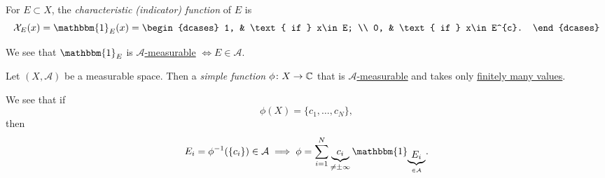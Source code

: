 \begin{definition}\label{def:characteristic-function}
	For \(E\subset X\), the \emph{characteristic (indicator) function} of \(E\) is
	\[
		\mathcal{X} _E (x)= \mathbbm{1}_{E}(x) = \begin{dcases}
			1, & \text{ if }  x\in E;     \\
			0, & \text{ if }  x\in E^{c}.
		\end{dcases}
	\]
\end{definition}
\begin{remark}
	We see that \(\mathbbm{1}_{ E}\) is \hyperref[def:A-measurable-function]{\(\mathcal{A}\)-measurable} \(\iff E\in\mathcal{A}\).
\end{remark}

\begin{definition}\label{def:simple-function}
	Let \((X, \mathcal{A} )\) be a measurable space. Then a \emph{simple function} \(\phi \colon X\to \mathbb{\MakeUppercase{c}} \) that
	is \hyperref[def:A-measurable-function]{\(\mathcal{A} \)-measurable} and takes only \underline{finitely many values}.
\end{definition}
\begin{remark}
	We see that if
	\[
		\phi (X) = \{c_1, \ldots , c_N \},
	\]
	then
	\[
		E_{i}= \phi ^{-1} (\{c_{i}\})\in \mathcal{A} \implies \phi = \sum\limits_{i=1}^{N} \underbrace{c_{i}}_{\neq \pm \infty }\mathbbm{1}_{\underbrace{E_{i}}_{\in \mathcal{A}}}.
	\]
\end{remark}